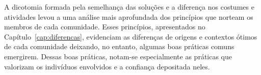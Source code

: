 A dicotomia formada pela semelhança das soluções e a diferença nos
costumes e atividades levou a uma análise mais aprofundada dos
princípios que norteam os membros de cada comunidade. Esses
princípios, apresentados no Capítulo~\ref{cap:diferencas}, evidenciam
as diferenças de origens e contextos ótimos de cada comunidade
deixando, no entanto, algumas boas práticas comuns emergirem. Dessas
boas práticas, notam-se especialmente as práticas que valorizam os
indivíduos envolvidos e a confiança depositada neles.